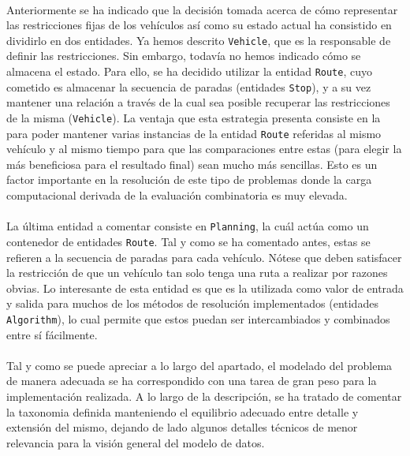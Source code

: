 \documentclass{subfiles}
\begin{document}
          \paragraph{}
          Anteriormente se ha indicado que la decisión tomada acerca de cómo representar las restricciones fijas de los vehículos así como su estado actual ha consistido en dividirlo en dos entidades. Ya hemos descrito \texttt{Vehicle}, que es la responsable de definir las restricciones. Sin embargo, todavía no hemos indicado cómo se almacena el estado. Para ello, se ha decidido utilizar la entidad \texttt{Route}, cuyo cometido es almacenar la secuencia de paradas (entidades \texttt{Stop}), y a su vez mantener una relación a través de la cual sea posible recuperar las restricciones de la misma (\texttt{Vehicle}). La ventaja que esta estrategia presenta consiste en la  para poder mantener varias instancias de la entidad \texttt{Route} referidas al mismo vehículo y al mismo tiempo para que las comparaciones entre estas (para elegir la más beneficiosa para el resultado final) sean mucho más sencillas. Esto es un factor importante en la resolución de este tipo de problemas donde la carga computacional derivada de la evaluación combinatoria es muy elevada. 

          \paragraph{}
          La última entidad a comentar consiste en \texttt{Planning}, la cuál actúa como un contenedor de entidades \texttt{Route}. Tal y como se ha comentado antes, estas se refieren a la secuencia de paradas para cada vehículo. Nótese que deben satisfacer la restricción de que  un vehículo tan solo tenga una ruta a realizar por razones obvias. Lo interesante de esta entidad es que es la utilizada como valor de entrada y salida para muchos de los métodos de resolución implementados (entidades \texttt{Algorithm}), lo cual permite que estos puedan ser intercambiados y combinados entre sí fácilmente.

          \paragraph{}
          Tal y como se puede apreciar a lo largo del apartado, el modelado del problema de manera adecuada se ha correspondido con una tarea de gran peso para la implementación realizada. A lo largo de la descripción, se ha tratado de comentar la taxonomia definida manteniendo el equilibrio adecuado entre detalle y extensión del mismo, dejando de lado algunos detalles técnicos de menor relevancia para la visión general del modelo de datos.
\end{document}
